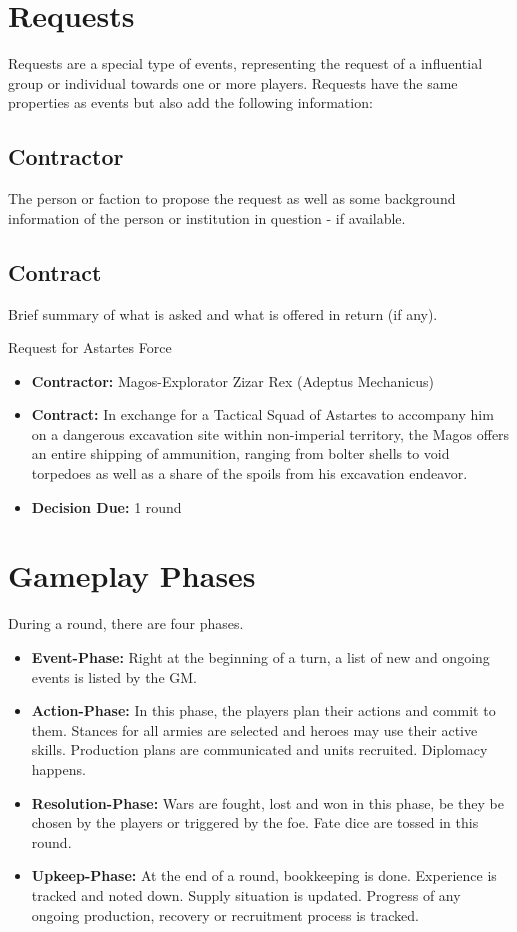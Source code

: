 \section{Requests}
Requests are a special type of events, representing the request of a influential group or individual towards one or more players. Requests have the same properties as events but also add the following information:

\subsection{Contractor}
The person or faction to propose the request as well as some background information of the person or institution in question - if available.

\subsection{Contract}
Brief summary of what is asked and what is offered in return (if any).

\begin{DndSidebar}{Request for Astartes Force}
\begin{itemize}
	\item \textbf{Contractor:} Magos-Explorator Zizar Rex (Adeptus Mechanicus)
	\item \textbf{Contract:} In exchange for a Tactical Squad of Astartes to accompany him on a dangerous excavation site within non-imperial territory, the Magos offers an entire shipping of ammunition, ranging from bolter shells to void torpedoes as well as a share of the spoils from his excavation endeavor.
	\item \textbf{Decision Due:} 1 round
\end{itemize}
\end{DndSidebar}


\section{Gameplay Phases}
During a round, there are four phases.
\begin{itemize}
	\item \textbf{Event-Phase:} Right at the beginning of a turn, a list of new and ongoing events is listed by the GM.
	\item \textbf{Action-Phase:} In this phase, the players plan their actions and commit to them. Stances for all armies are selected and heroes may use their active skills. Production plans are communicated and units recruited. Diplomacy happens.
	\item \textbf{Resolution-Phase:} Wars are fought, lost and won in this phase, be they be chosen by the players or triggered by the foe. Fate dice are tossed in this round.
	\item \textbf{Upkeep-Phase:} At the end of a round, bookkeeping is done. Experience is tracked and noted down. Supply situation is updated. Progress of any ongoing production, recovery or recruitment process is tracked.
\end{itemize}